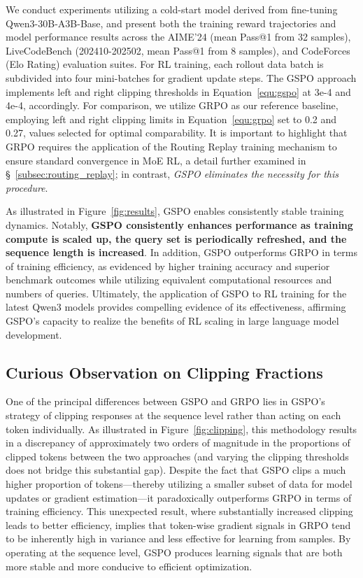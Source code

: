 We conduct experiments utilizing a cold-start model derived from fine-tuning Qwen3-30B-A3B-Base, and present both the training reward trajectories and model performance results across the AIME'24 (mean Pass@1 from 32 samples), LiveCodeBench (202410-202502, mean Pass@1 from 8 samples), and CodeForces (Elo Rating) evaluation suites. For RL training, each rollout data batch is subdivided into four mini-batches for gradient update steps. The GSPO approach implements left and right clipping thresholds in Equation~\eqref{equ:gspo} at 3e-4 and 4e-4, accordingly. For comparison, we utilize GRPO as our reference baseline, employing left and right clipping limits in Equation~\eqref{equ:grpo} set to 0.2 and 0.27, values selected for optimal comparability. It is important to highlight that GRPO requires the application of the Routing Replay training mechanism to ensure standard convergence in MoE RL, a detail further examined in \S~\ref{subsec:routing_replay}; in contrast, \textit{GSPO eliminates the necessity for this procedure}.

As illustrated in Figure~\ref{fig:results}, GSPO enables consistently stable training dynamics. Notably, \textbf{GSPO consistently enhances performance as training compute is scaled up, the query set is periodically refreshed, and the sequence length is increased}. In addition, GSPO outperforms GRPO in terms of training efficiency, as evidenced by higher training accuracy and superior benchmark outcomes while utilizing equivalent computational resources and numbers of queries. Ultimately, the application of GSPO to RL training for the latest Qwen3 models provides compelling evidence of its effectiveness, affirming GSPO's capacity to realize the benefits of RL scaling in large language model development.

\subsection{Curious Observation on Clipping Fractions}

One of the principal differences between GSPO and GRPO lies in GSPO's strategy of clipping responses at the sequence level rather than acting on each token individually. As illustrated in Figure~\ref{fig:clipping}, this methodology results in a discrepancy of approximately two orders of magnitude in the proportions of clipped tokens between the two approaches (and varying the clipping thresholds does not bridge this substantial gap). Despite the fact that GSPO clips a much higher proportion of tokens—thereby utilizing a smaller subset of data for model updates or gradient estimation—it paradoxically outperforms GRPO in terms of training efficiency. This unexpected result, where substantially increased clipping leads to better efficiency, implies that token-wise gradient signals in GRPO tend to be inherently high in variance and less effective for learning from samples. By operating at the sequence level, GSPO produces learning signals that are both more stable and more conducive to efficient optimization.

